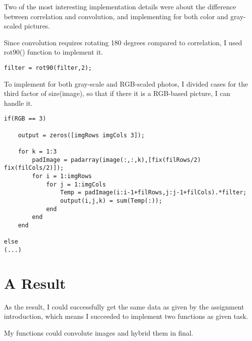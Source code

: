 Two of the most interesting implementation details were about the difference between correlation and convolution, and implementing for both color and gray-scaled pictures. 

Since convolution requires rotating 180 degrees compared to correlation, I used rot90() function to implement it. 

\begin{lstlisting}[style=Matlab-editor]
filter = rot90(filter,2);
\end{lstlisting}

To implement for both gray-scale and RGB-scaled photos, I divided cases for the third factor of size(image), so that if there it is a RGB-based picture, I can handle it.

	\begin{lstlisting}[style=Matlab-editor]
if(RGB == 3) 
    
    output = zeros([imgRows imgCols 3]);
        
    for k = 1:3
        padImage = padarray(image(:,:,k),[fix(filRows/2) fix(filCols/2)]);
        for i = 1:imgRows
            for j = 1:imgCols
                Temp = padImage(i:i-1+filRows,j:j-1+filCols).*filter;
                output(i,j,k) = sum(Temp(:));
            end
        end
    end
        
else
(...)
    \end{lstlisting}



\section*{A Result}

As the result, I could successfully get the same data as given by the assignment introduction, which means I succeeded to implement two functions as given task. 

My functions could convolute images and hybrid them in final.


